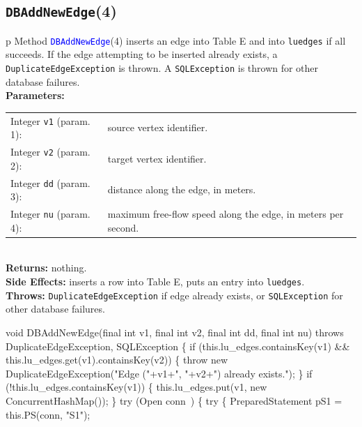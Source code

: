 \subsection{\texttt{DBAddNewEdge}(4)}
\begin{tabular}{p{\textwidth}}
\toprule
{}
Method \textcolor{blue}{{\tt{}\protect{}DBAddNewEdge}}(4) inserts an edge into Table E
and into {\tt{}lu{}edges} if all succeeds. If the edge attempting to be inserted
already exists, a {\tt{}DuplicateEdgeException} is thrown. A {\tt{}SQLException}
is thrown for other database failures.\\
\midrule
\textbf{Parameters:} \\
\begin{tabular}{lp{116mm}}
Integer {\tt{}v1} (param. 1):&source vertex identifier.\\
Integer {\tt{}v2} (param. 2):&target vertex identifier.\\
Integer {\tt{}dd} (param. 3):&distance along the edge, in meters.\\
Integer {\tt{}nu} (param. 4):&maximum free-flow speed along the edge, in meters per second.\\
\end{tabular}\\
\textbf{Returns:} nothing.\\
\textbf{Side Effects:} inserts a row into Table E, puts an entry into
{\tt{}lu{}edges}.\\
\textbf{Throws:} {\tt{}DuplicateEdgeException} if edge already exists, or
{\tt{}SQLException} for other database failures.\\
\bottomrule
\end{tabular}
\nwenddocs{}\endmoddef{}
void DBAddNewEdge(final int v1, final int v2, final int dd, final int nu)
throws DuplicateEdgeException, SQLException \{
  if (this.lu_edges.containsKey(v1) && this.lu_edges.get(v1).containsKey(v2)) \{
    throw new DuplicateEdgeException("Edge ("+v1+", "+v2+") already exists.");
  \}
  if (!this.lu_edges.containsKey(v1)) \{
    this.lu_edges.put(v1, new ConcurrentHashMap());
  \}
  try (\LA{}Open \code{}conn\edoc{}~{\nwtagstyle{}}\RA{}) \{
    try \{
      PreparedStatement pS1 = this.PS(conn, "S1");

